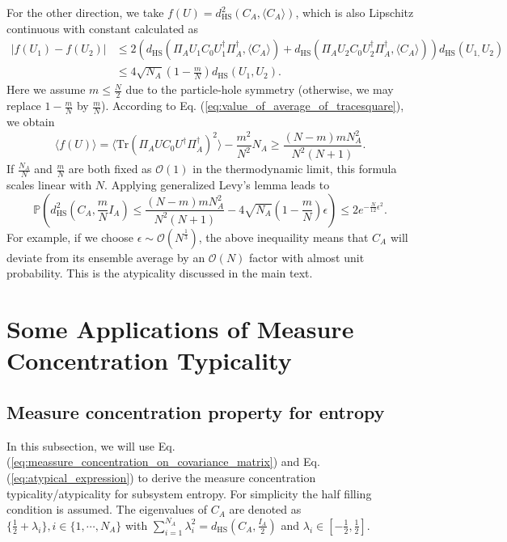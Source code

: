 For the other direction, %
we take $f(U)=d_{\mathrm{HS}}^{2}(C_{A},\langle C_{A}\rangle)$,
which %
is also Lipschitz continuous with constant calculated as
\begin{align}
|f(U_{1})-f(U_{2})| & \leq2(d_{\mathrm{HS}}(\Pi_{A}U_{1}C_{0}U_{1}^{\dagger}\Pi_{A}^{\dagger},\langle C_{A}\rangle)+d_{\mathrm{HS}}(\Pi_{A}U_{2}C_{0}U_{2}^{\dagger}\Pi_{A}^{\dagger},\langle C_{A}\rangle))d_{\mathrm{HS}}(U_{1,}U_{2})\nonumber \\
 & \leq4\sqrt{N_{A}}\left(1-\frac{m}{N}\right)d_{\mathrm{HS}}(U_{1},U_{2}).
\end{align}
Here we assume $m\leq\frac{N}{2}$ due to the particle-hole symmetry (otherwise, we may replace $1-\frac{m}{N}$ by $\frac{m}{N}$). According to Eq. (\ref{eq:value_of_average_of_tracesquare}), we obtain
\begin{equation}
\langle f(U)\rangle=\langle\mathrm{Tr}(\Pi_{A}UC_{0}U^{\dagger}\Pi_{A}^{\dagger})^{2}\rangle-\frac{m^{2}}{N^{2}}N_{A}\geq\frac{(N-m)mN_{A}^{2}}{N^{2}(N+1)}.
\end{equation}
If $\frac{N_{A}}{N}$ and $\frac{m}{N}$ are both fixed as $\mathcal{O}(1)$ in the thermodynamic limit, this formula scales linear with $N$. Applying generalized
Levy's lemma leads to 
\begin{equation}
\mathbb{P}\left(d_{\mathrm{HS}}^{2}\left(C_{A},\frac{m}{N}I_{A}\right)\leq\frac{(N-m)mN_{A}^{2}}{N^{2}(N+1)}-4\sqrt{N_{A}}\left(1-\frac{m}{N}\right)\epsilon\right)\leq2e^{-\frac{N}{12}\epsilon^{2}}. 
\label{eq:atypical_expression}
\end{equation}
For example, if we choose $\epsilon\sim\mathcal{O}(N^{\frac{1}{3}})$,
the above inequaility means that $C_{A}$ will deviate from its
ensemble average by an $\mathcal{O}(N)$ factor with almost unit probability. %
This is the atypicality discussed in the main text. 


\section{Some Applications of Measure Concentration Typicality}

\subsection{Measure concentration property for entropy}

In this subsection, we will use Eq. (\ref{eq:meassure_concentration_on_covariance_matrix})
and Eq. (\ref{eq:atypical_expression}) to derive the measure concentration
typicality/atypicality for subsystem entropy. For simplicity the half
filling condition is assumed. The eigenvalues of $C_{A}$ are denoted
as $\{\frac{1}{2}+\lambda_{i}\},i\in\{1,\cdots,N_{A}\}$ with $\sum_{i=1}^{N_{A}}\lambda_{i}^{2}=d_{\mathrm{HS}}(C_{A},\frac{I_{A}}{2})$
and $\lambda_{i}\in[-\frac{1}{2},\frac{1}{2}]$.

